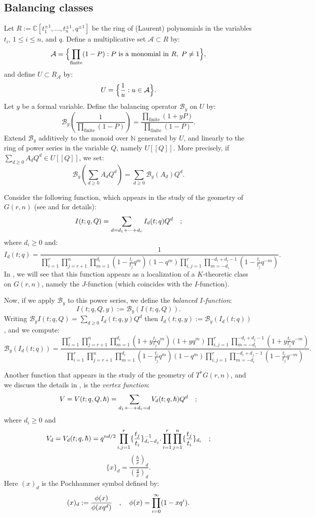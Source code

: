 \documentclass{amsart}
\begin{document}
\subsection{Balancing classes}   Let  $R:=\mathbb{C}[{t_1^{\pm 1}},\dots,{t_n ^{\pm 1}},q^{\pm1}]$ be the ring of  (Laurent) polynomials in the variables ${t_i}$, $1 \leq i \leq n$, and $q$. Define a multiplicative set $\mathcal{A} \subset R$ by:
\[
\mathcal{A} = \Bigl\{\prod_{\text{finite}}(1-P) : \text{$P$ is a monomial in $ R,\; P \ne 1$} \Bigr\},
\]
and define $U \subset R_\mathcal{A}$ by:
\[
U = \Bigl\{\frac{1}{u}: u \in \mathcal{A} \Bigr\}.
\]
Let $y$ be a formal variable. Define the balancing operator $\mathcal{B}_y$ on $U$ by:
\[
\mathcal{B}_y(\frac{1}{\prod_{\text{finite}}(1-P)}) = \frac{\prod_{\text{finite}}(1+yP)}{\prod_{\text{finite}}(1-P)}.
\]
Extend $\mathcal{B}_y$ additively to the monoid over $\mathbb{N}$ generated by $U$, and linearly to the ring of power series in the variable $Q$, namely $U[[Q]]$. More precisely, if $\sum_{d \geq 0}A_d Q^d  \in U[[Q]]$, we set:
\[
\mathcal{B}_y(\sum_{d \geq 0}A_d Q^d) = \sum_{d\geq 0} \mathcal{B}_y(A_d)Q^d.
\]

Consider the following function, which appears in the study of the geometry of $G(r,n)$ (see  and  for details):
\[
I(t;q,Q) = \sum_{d=d_1+\dots+d_r} I_d(t;q) Q^d   \quad \/;
\]
where $d_i \geq 0$ and:
\[
I_d(t;q)=\frac{1}{\prod_{i=1}^r \prod_{j=r+1}^n\prod_{m=1}^{d_i}(1-\frac{t_i}{t_j}q^{m})(1-q^m)\prod_{i,j=1}^r \prod_{m=-d_i}^{-d_i+d_j-1}(1-\frac{t_i}{t_j}q^{-m})}.
\]
In , we will see that this function appears as a localization of a $K$-theoretic class on $G(r,n)$, namely the $J$-function (which coincides with the $I$-function).

Now, if we apply $\mathcal{B}_y$ to this power series, we define the {\em balanced $I$-function}:
\[
I(t;q,Q,y):=\mathcal{B}_y(I(t;q,Q)) .\]
Writing $\mathcal{B}_y I(t;q,Q)  = \sum_{d \geq 0} I_d(t;q,y)Q^d$
then $I_d(t;q,y):=\mathcal{B}_y(I_d(t;q))$, and we compute:
\[
\mathcal{B}_y(I_d(t;q)) = \frac{\prod_{i=1}^r \prod_{j=r+1}^n\prod_{m=1}^{d_i}(1+y\frac{t_i}{t_j}q^{m})(1+y q^m)\prod_{i,j=1}^r \prod_{m=-d_i}^{-d_i+d_j-1}(1+y\frac{t_i}{t_j} q^{-m})}{\prod_{i =1}^r \prod_{j =r+1}^n\prod_{m=1}^{d_i}(1-\frac{t_i}{t_j}q^{m})(1-q^m)\prod_{i,j=1}^r \prod_{m=-d_i}^{-d_i+d_j-1}(1-\frac{t_i}{t_j}q^{-m})}.
\]



Another function that appears in the study of the geometry of $T^*G(r,n)$, and we discuss the details in , is the {\em vertex function}:
\[
V= V(t;q,Q,\hbar) = \sum_{d_1+\dots+d_r=d}V_d(t;q,\hbar) Q^d \quad \/;
\]
where $d_i \geq 0$ and
\[
V_d=V_d(t;q,\hbar) = q^{nd/2}\prod_{i,j=1}^r \{\frac{t_j}{t_i}\}_{d_i-d_j}^{-1}.\prod_{i=1}^{r}\prod_{j=1}^{n}\{\frac{t_j}{t_i}\}_{d_i} \quad \/;
\]
\[
\]
 \[
   \{x\}_d = \frac{(\frac{\hbar}{x})_d}{(\frac{q}{x})_d}.
 \]
 Here $(x)_d$ is the Pochhammer symbol defined by: 
\begin{equation}\label{Pochammer Symbols}
(x)_d:=\frac{\phi(x)}{\phi(xq^d)}  \quad \/, \quad \phi(x) = \prod_{i=0}^{\infty}(1-xq^i).
\end{equation}
\end{document}
